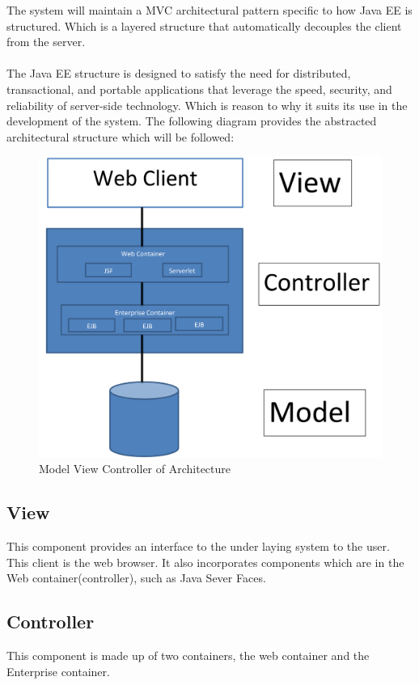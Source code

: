 \documentclass[12pt]{article}
\begin{document}
The system will maintain a MVC architectural pattern specific to how Java EE is structured. Which is a layered structure that automatically decouples the client from the server.\\
\\
The Java EE structure is designed to satisfy the need for distributed, transactional, and portable applications that leverage the speed, security, and reliability of server-side technology. Which is reason to why it suits its use in the development of the system. The following diagram provides the abstracted architectural structure which will be followed:
\begin{figure}
\includegraphics[scale=0.2]{../Images_Docs/Diagrams/Architecture/MVC.jpg}
\caption{Model View Controller of Architecture}
\end{figure}

\subsection*{View}
This component provides an interface to the under laying system to the user. This client is the web browser. It also incorporates components which are in the Web container(controller), such as Java Sever Faces. 
\subsection*{Controller}
This component is made up of two containers, the web container and the Enterprise container.
\end{document}
